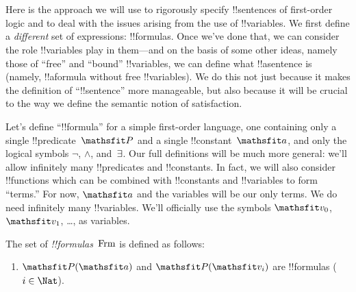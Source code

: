\documentclass[../../../include/open-logic-section]{subfiles}
\begin{document}

\section{}

Here is the approach we will use to rigorously specify !!{sentence}s
of first-order logic and to deal with the issues arising from the use
of !!{variable}s. We first define a \emph{different} set of
expressions: !!{formula}s. Once we've done that, we can consider the
role !!{variable}s play in them---and on the basis of some other
ideas, namely those of ``free'' and ``bound'' !!{variable}s, we can
define what !!a{sentence} is (namely, !!a{formula} without free
!!{variable}s). We do this not just because it makes the definition of
``!!{sentence}'' more manageable, but also because it will be crucial
to the way we define the semantic notion of satisfaction.

Let's define ``!!{formula}'' for a simple first-order language, one
containing only a single !!{predicate}~$\Obj P$ and a single
!!{constant}~$\Obj a$, and only the logical symbols $\lnot$, $\land$,
and~$\lexists$. Our full definitions will be much more general:
we'll allow infinitely many !!{predicate}s and !!{constant}s. In fact,
we will also consider !!{function}s which can be combined with
!!{constant}s and !!{variable}s to form ``terms.'' For now, $\Obj a$
and the variables will be our only terms.  We do need infinitely many
!!{variable}s.  We'll officially use the symbols $\Obj v_0$, $\Obj
v_1$, \dots, as variables.

\begin{defn}
The set of \emph{!!{formula}s}~$\Frm$ is defined as follows:
\begin{enumerate}
\item{} $\Atom{\Obj P}{\Obj a}$ and $\Atom{\Obj
  P}{\Obj v_i}$ are !!{formula}s ($i \in \Nat$).




\end{enumerate}
\end{defn}
\end{document}
